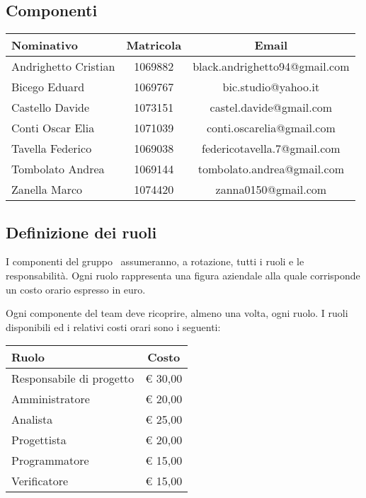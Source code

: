 \documentclass[../PianoProgetto.tex]{subfiles}
\begin{document}
\begin{appendices}
\begin{table}[h]
	\end{table}
				
	\clearpage
	
	\subsection{Componenti}
	
		\begin{table}[h]
		\centering
	
		\begin{tabular}{lcc}
			\toprule
			Nominativo & Matricola & Email \\
			\midrule
			Andrighetto Cristian & 1069882 & black.andrighetto94@gmail.com \\
			\midrule
			Bicego Eduard& 1069767 & bic.studio@yahoo.it  \\
			\midrule
			Castello Davide	& 1073151 &	 castel.davide@gmail.com\\
			\midrule
			Conti Oscar Elia & 1071039 & conti.oscarelia@gmail.com \\
			\midrule
			Tavella Federico & 1069038 & federicotavella.7@gmail.com\\
			\midrule
			Tombolato Andrea & 1069144 & tombolato.andrea@gmail.com	 \\
			\midrule
			Zanella Marco & 1074420 & zanna0150@gmail.com \\
			\bottomrule
		\end{tabular}
		
		\end{table}		
		

	\subsection{Definizione dei ruoli}
	I componenti del gruppo \leaf\ assumeranno, a rotazione, tutti i ruoli e le responsabilità. Ogni ruolo rappresenta una figura aziendale alla quale corrisponde un costo orario espresso in euro.

Ogni componente del team deve ricoprire, almeno una volta, ogni ruolo.
I ruoli disponibili ed i relativi costi orari sono i seguenti:

	\begin{table}[h]
		\centering
	
		\begin{tabular}{lc}
			\toprule
			Ruolo & Costo \\
			\midrule
			Responsabile di progetto & \euro{} 30,00	 \\
			\midrule
			Amministratore & \euro{} 20,00	 \\
			\midrule
			Analista & \euro{} 25,00	 \\
			\midrule
			Progettista & \euro{} 20,00	 \\
			\midrule
			Programmatore & \euro{} 15,00	 \\
			\midrule
			Verificatore & \euro{} 15,00	 \\
			\bottomrule
		\end{tabular}
		
		\end{table}		
\end{appendices}
\end{document}
